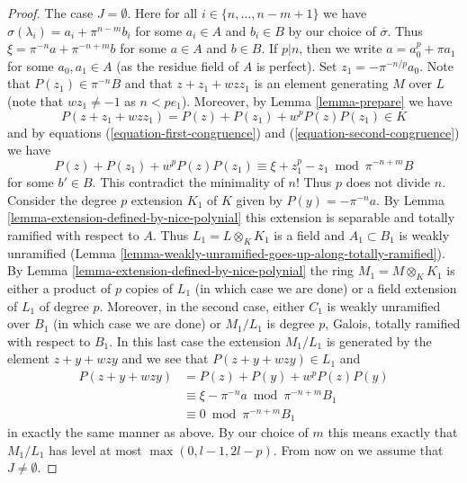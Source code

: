 \begin{proof}
\medskip\noindent
The case $J = \emptyset$. Here for all $i \in \{n, \ldots, n - m + 1\}$
we have $\sigma(\lambda_i) = a_i + \pi^{n - m}b_i$ for some $a_i \in A$
and $b_i \in B$ by our choice of $\overline{\sigma}$. Thus
$\xi = \pi^{-n} a + \pi^{-n + m} b$ for some $a \in A$ and $b \in B$.
If $p | n$, then we write $a = a_0^p + \pi a_1$ for some $a_0, a_1 \in A$
(as the residue field of $A$ is perfect). Set $z_1 = - \pi^{-n/p} a_0$.
Note that $P(z_1) \in \pi^{-n}B$ and that $z + z_1 + w z z_1$ is an
element generating $M$ over $L$ (note that $wz_1 \not = -1$ as
$n < pe_1$). Moreover, by Lemma \ref{lemma-prepare} we have
$$
P(z + z_1 + w z z_1) = P(z) + P(z_1) + w^p P(z) P(z_1) \in K
$$
and by equations (\ref{equation-first-congruence}) and
(\ref{equation-second-congruence}) we have
$$
P(z) + P(z_1) + w^p P(z) P(z_1)
\equiv
\xi + z_1^p - z_1 \bmod \pi^{-n + m}B
$$
for some $b' \in B$. This contradict the minimality of $n$! Thus $p$
does not divide $n$. Consider the degree $p$ extension $K_1$ of $K$ given
by $P(y) = -\pi^{-n}a$. By Lemma \ref{lemma-extension-defined-by-nice-polynial}
this extension is separable and totally ramified with respect to $A$.
Thus $L_1 = L \otimes_K K_1$
is a field and $A_1 \subset B_1$ is weakly unramified
(Lemma \ref{lemma-weakly-unramified-goes-up-along-totally-ramified}).
By Lemma \ref{lemma-extension-defined-by-nice-polynial}
the ring $M_1 = M \otimes_K K_1$ is either a product of $p$ copies
of $L_1$ (in which case we are done) or a field extension of $L_1$
of degree $p$. Moreover, in the second case, either $C_1$ is weakly unramified
over $B_1$ (in which case we are done) or $M_1/L_1$ is degree $p$,
Galois, totally ramified with respect to $B_1$.
In this last case the extension $M_1/L_1$
is generated by the element $z + y + wzy$ and we see that
$P(z + y + wzy) \in L_1$ and
\begin{align*}
P(z + y + wzy)
& = P(z) + P(y) + w^p P(z) P(y) \\
& \equiv
\xi - \pi^{-n}a \bmod \pi^{-n + m}B_1 \\
& \equiv
0 \bmod \pi^{-n + m}B_1
\end{align*}
in exactly the same manner as above. By our choice of $m$ this
means exactly that $M_1/L_1$ has level at most $\max(0, l - 1, 2l - p)$.
From now on we assume that $J \not = \emptyset$.


\end{proof}

